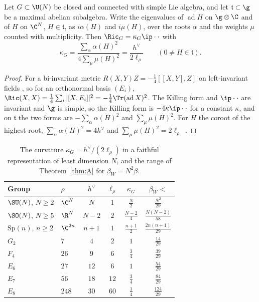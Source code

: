 \begin{lemma}\label{lem:ricci}
Let $G\subset\U(N)$ be closed and connected with simple Lie algebra, and let
$\mathfrak t\subset\g$ be a maximal abelian subalgebra. Write the eigenvalues
of $\operatorname{ad}H$ on $\g\otimes\C$ and of $H$ on $\C^N$, $H\in\mathfrak t$, as
$i\alpha(H)$ and $i\mu(H)$, over the roots $\alpha$ and the weights $\mu$ counted
with multiplicity. Then $\Ric_G=\kappa_G\ip\cdot\cdot$ with
\[
\kappa_G=\frac{\sum_\alpha\alpha(H)^2}{4\sum_\mu\mu(H)^2}=\frac{h^\vee}{2\ell_\rho}
\qquad(0\ne H\in\mathfrak t).
\]
\end{lemma}

\begin{proof}
For a bi-invariant metric $R(X,Y)Z=-\frac14[[X,Y],Z]$ on left-invariant fields
\cite[Sect.~7]{Mil76}, so for an orthonormal basis $(E_i)$,
$\Ric(X,X)=\frac14\sum_i|[X,E_i]|^2=-\frac14\Tr(\operatorname{ad}X)^2$. The
Killing form and $\ip\cdot\cdot$ are invariant and $\g$ is simple, so the
Killing form is $-4\kappa\ip\cdot\cdot$ for a constant $\kappa$, and on
$\mathfrak t$ the two forms are $-\sum_\alpha\alpha(H)^2$ and $\sum_\mu\mu(H)^2$.
For $H$ the coroot of the highest root, $\sum_\alpha\alpha(H)^2=4h^\vee$ and
$\sum_\mu\mu(H)^2=2\ell_\rho$~\cite[Ch.~6]{Kac90}.
\end{proof}

\begin{table}[t]
\caption{The curvature $\kappa_G=h^\vee/(2\ell_\rho)$ in a faithful
representation of least dimension $N$, and the range of Theorem~\ref{thm:A}
for $\beta_W=N^2\beta$.}
\label{tab:groups}
\begin{tabular}{llcccc}
\toprule
Group&$\rho$&$h^\vee$&$\ell_\rho$&$\kappa_G$&$\beta_W<$\\
\midrule
$\SU(N)$, $N\ge2$&$\C^N$&$N$&$1$&$\frac N2$&$\frac{N^2}{29}$\\
$\SO(N)$, $N\ge5$&$\R^N$&$N-2$&$2$&$\frac{N-2}4$&$\frac{N(N-2)}{58}$\\
$\mathrm{Sp}(n)$, $n\ge2$&$\C^{2n}$&$n+1$&$1$&$\frac{n+1}2$&$\frac{2n(n+1)}{29}$\\
$G_2$&$7$&$4$&$2$&$1$&$\frac{14}{29}$\\
$F_4$&$26$&$9$&$6$&$\frac34$&$\frac{39}{29}$\\
$E_6$&$27$&$12$&$6$&$1$&$\frac{54}{29}$\\
$E_7$&$56$&$18$&$12$&$\frac34$&$\frac{84}{29}$\\
$E_8$&$248$&$30$&$60$&$\frac14$&$\frac{124}{29}$\\
\bottomrule
\end{tabular}
\end{table}

